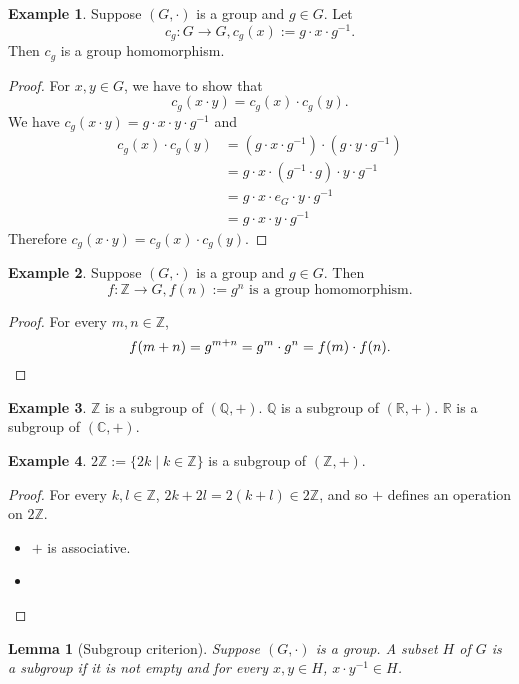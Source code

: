 \documentclass{article}
\theoremstyle{plain}
\newtheorem{lemma}{Lemma}
\theoremstyle{definition}
\newtheorem{example}{Example}
\newcommand{\FR}{\mathbb{R}}
\newcommand{\FC}{\mathbb{C}}
\newcommand{\FQ}{\mathbb{Q}}
\newcommand{\FZ}{\mathbb{Z}}
\begin{document}
\begin{example}
    Suppose $(G,\cdot)$ is a group and $g\in G$. Let
    \[c_g:G\to G,c_g(x):=g\cdot x\cdot g^{-1}.\]
    Then $c_g$ is a group homomorphism.
\end{example}

\begin{proof}
    For $x,y\in G$, we have to show that 
    \[c_g(x\cdot y)=c_g(x)\cdot c_g(y).\]
    We have $c_g(x\cdot y)=g\cdot x\cdot y\cdot g^{-1}$ and 
    \[\begin{split}
        c_g(x)\cdot c_g(y)
        &=(g\cdot x\cdot g^{-1})\cdot(g\cdot y\cdot g^{-1})\\
        &=g\cdot x\cdot (g^{-1}\cdot g)\cdot y\cdot g^{-1}\\
        &=g\cdot x\cdot e_G\cdot y\cdot g^{-1}\\
        &=g\cdot x\cdot y\cdot g^{-1}
    \end{split}\]
    Therefore $c_g(x\cdot y)=c_g(x)\cdot c_g(y)$.
\end{proof}

\begin{example}
    Suppose $(G,\cdot)$ is a group and $g\in G$. Then
    \[f:\mathbb{Z}\to G,f(n):=g^n\text{ is a group homomorphism.}\]
\end{example}

\begin{proof}
    For every $m,n\in\mathbb{Z}$,
    \[f(m+n)=g^{m+n}=g^m\cdot g^n=f(m)\cdot f(n).\qedhere\]
\end{proof}

\begin{example}
    $\FZ$ is a subgroup of $(\FQ,+)$.
    $\FQ$ is a subgroup of $(\FR,+)$.
    $\FR$ is a subgroup of $(\FC,+)$.
\end{example}

\begin{example}
    $2\FZ:=\{2k\mid k\in\FZ\}$ is a subgroup of $(\FZ,+)$.
\end{example}

\begin{proof}
    For every $k,l\in\FZ$, $2k+2l=2(k+l)\in2\FZ$, and so $+$
    defines an operation on $2\FZ$.
    \begin{itemize}
        \item $+$ is associative.
        \item 
    \end{itemize}
\end{proof}


\begin{lemma}[Subgroup criterion]
    Suppose $(G,\cdot)$ is a group. A subset $H$ of $G$
    is a subgroup if it is not empty and for 
    every $x,y\in H$, $x\cdot y^{-1}\in H$.
\end{lemma}
\end{document}
